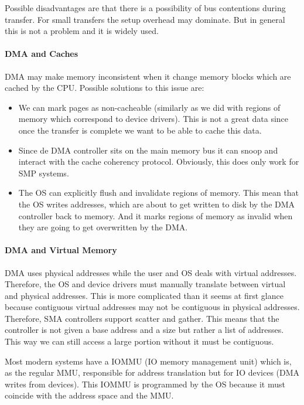 Possible disadvantages are that there is a possibility of bus contentions during transfer. For small transfers the setup overhead may dominate. But in general this is not a problem and it is widely used.

\paragraph{DMA and Caches}
DMA may make memory inconsistent when it change memory blocks which are cached by the CPU. Possible solutions to this issue are:

\begin{itemize}
    \item We can mark pages as non-cacheable (similarly as we did with regions of memory which correspond to device drivers). This is not a great data since once the transfer is complete we want to be able to cache this data.
    \item Since de DMA controller sits on the main memory bus it can snoop and interact with the cache coherency protocol. Obviously, this does only work for SMP systems.
    \item The OS can explicitly flush and invalidate regions of memory. This mean that the OS writes addresses, which are about to get written to disk by the DMA controller back to memory. And it marks regions of memory as invalid when they are going to get overwritten by the DMA.
\end{itemize}

\paragraph{DMA and Virtual Memory}
DMA uses physical addresses while the user and OS deals with virtual addresses. Therefore, the OS and device drivers must manually translate between virtual and physical addresses. This is more complicated than it seems at first glance because contiguous virtual addresses may not be contiguous in physical addresses. Therefore, SMA controllers support scatter and gather. This means that the controller is not given a base address and a size but rather a list of addresses. This way we can still access a large portion without it must be contiguous.

Most modern systems have a IOMMU (IO memory management unit) which is, as the regular MMU, responsible for address translation but for IO devices (DMA writes from devices). This IOMMU is programmed by the OS because it must coincide with the address space and the MMU.

